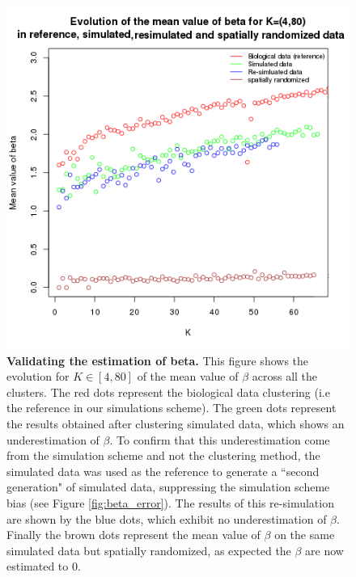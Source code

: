 	\begin{figure}[H]
\centerline{\includegraphics[width=0.8\linewidth]{gfx/chapter5/beta_valid.png}}
\caption{{\bf Validating the estimation of beta.} This figure shows the evolution for $K \in [4,80]$ of the mean value of $\beta$ across all the clusters. The red dots represent the biological data clustering (i.e the reference in our simulations scheme). The green dots represent the results obtained after clustering simulated data, which shows an underestimation of $\beta$. To confirm that this underestimation come from the simulation scheme and not the clustering method, the simulated data was used as the reference to generate a ``second generation" of simulated data, suppressing the simulation scheme bias (see Figure \ref{fig:beta_error}). The results of this re-simulation are shown by the blue dots, which exhibit no underestimation of $\beta$. Finally the brown dots represent the mean value of $\beta$ on the same simulated data but spatially randomized, as expected the $\beta$ are now estimated to $0$.}
\label{fig:beta_validation}
	\end{figure}
	
